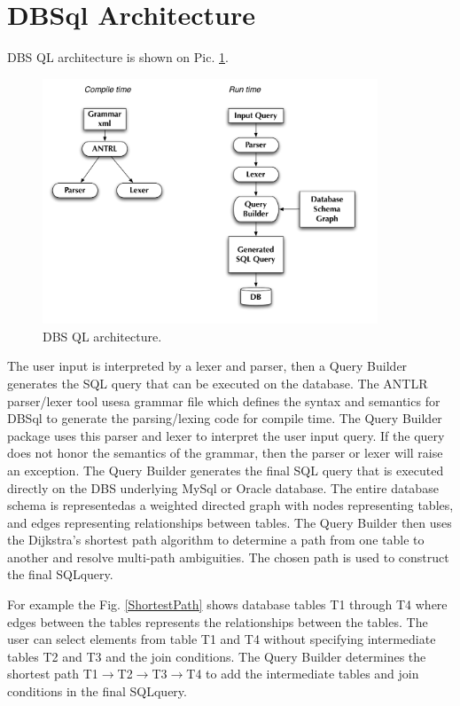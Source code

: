 \documentclass[a4paper]{jpconf}
\begin{document}
\section{DBSql Architecture}
DBS QL architecture is shown on Pic. \ref{DBS_QL}.
\begin{figure}[htb]
\centering
\includegraphics[width=100mm]{DBS_QL_architecture.pdf}
\caption{DBS QL architecture.}
\label{DBS_QL}
\end{figure}

The user input is interpreted by a lexer and parser, 
then a Query Builder generates the SQL query that can be executed on 
the database. The ANTLR \cite{ANTLR} parser/lexer tool 
usesa grammar file which defines the syntax and semantics for 
DBSql to generate the parsing/lexing code for compile time. 
The Query Builder package uses this parser and lexer to interpret 
the user input query. If the query does not honor the semantics of the 
grammar, then the parser or lexer will raise an exception. 
The Query Builder generates the final SQL query that is executed
directly on the DBS underlying MySql or Oracle database. 
The entire database schema is representedas a weighted
directed graph with nodes representing tables, and edges 
representing relationships between tables. The Query Builder
then uses the Dijkstra’s shortest path algorithm to determine a 
path from one table to another and resolve multi-path ambiguities.
The chosen path is used to construct the final SQLquery. 


For example the Fig. \ref{ShortestPath} shows database tables 
T1 through T4  where edges between the tables represents the 
relationships between the tables. The user can select elements
from table T1 and T4 without specifying intermediate tables T2 
and T3 and the join conditions. The Query Builder determines
the shortest path 
T1$\rightarrow$T2$\rightarrow$T3$\rightarrow$T4 
to add the intermediate tables 
and join conditions in the final SQLquery. 
\end{document}
